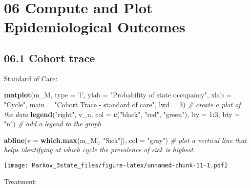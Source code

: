 \documentclass[
]{article}
\newenvironment{Shaded}{\begin{snugshade}}{\end{snugshade}}
\newcommand{\CommentTok}[1]{\textcolor[rgb]{0.56,0.35,0.01}{\textit{#1}}}
\newcommand{\DataTypeTok}[1]{\textcolor[rgb]{0.13,0.29,0.53}{#1}}
\newcommand{\DecValTok}[1]{\textcolor[rgb]{0.00,0.00,0.81}{#1}}
\newcommand{\KeywordTok}[1]{\textcolor[rgb]{0.13,0.29,0.53}{\textbf{#1}}}
\newcommand{\NormalTok}[1]{#1}
\newcommand{\OperatorTok}[1]{\textcolor[rgb]{0.81,0.36,0.00}{\textbf{#1}}}
\newcommand{\StringTok}[1]{\textcolor[rgb]{0.31,0.60,0.02}{#1}}
\begin{document}
\hypertarget{compute-and-plot-epidemiological-outcomes}{%
\section{06 Compute and Plot Epidemiological
Outcomes}\label{compute-and-plot-epidemiological-outcomes}}

\hypertarget{cohort-trace-1}{%
\subsection{06.1 Cohort trace}\label{cohort-trace-1}}

Standard of Care:

\begin{Shaded}
\begin{Highlighting}[]
\KeywordTok{matplot}\NormalTok{(m_M, }\DataTypeTok{type =} \StringTok{'l'}\NormalTok{, }
        \DataTypeTok{ylab =} \StringTok{"Probability of state occupancy"}\NormalTok{,}
        \DataTypeTok{xlab =} \StringTok{"Cycle"}\NormalTok{,}
        \DataTypeTok{main =} \StringTok{"Cohort Trace - standard of care"}\NormalTok{, }\DataTypeTok{lwd =} \DecValTok{3}\NormalTok{)  }\CommentTok{# create a plot of the data}
\KeywordTok{legend}\NormalTok{(}\StringTok{"right"}\NormalTok{, v_n, }\DataTypeTok{col =} \KeywordTok{c}\NormalTok{(}\StringTok{"black"}\NormalTok{, }\StringTok{"red"}\NormalTok{, }\StringTok{"green"}\NormalTok{), }
       \DataTypeTok{lty =} \DecValTok{1}\OperatorTok{:}\DecValTok{3}\NormalTok{, }\DataTypeTok{bty =} \StringTok{"n"}\NormalTok{)                            }\CommentTok{# add a legend to the graph}

\KeywordTok{abline}\NormalTok{(}\DataTypeTok{v =} \KeywordTok{which.max}\NormalTok{(m_M[, }\StringTok{"Sick"}\NormalTok{]), }\DataTypeTok{col =} \StringTok{"gray"}\NormalTok{)      }\CommentTok{# plot a vertical line that helps identifying at which cycle the prevalence of sick is highest.  }
\end{Highlighting}
\end{Shaded}

\texttt{[image: Markov\_3state\_files/figure-latex/unnamed-chunk-11-1.pdf]}

Treatment:
\end{document}
